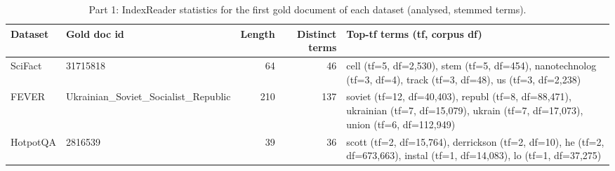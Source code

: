 \begin{table}[ht]\centering\small
\begin{tabular}{llrrp{}}\toprule
Dataset & Gold doc id & Length & Distinct terms & Top-tf terms (tf, corpus df) \\ \midrule
SciFact & 31715818 & 64 & 46 & cell (tf=5, df=2,530), stem (tf=5, df=454), nanotechnolog (tf=3, df=4), track (tf=3, df=48), us (tf=3, df=2,238) \\
FEVER & Ukrainian\_Soviet\_Socialist\_Republic & 210 & 137 & soviet (tf=12, df=40,403), republ (tf=8, df=88,471), ukrainian (tf=7, df=15,079), ukrain (tf=7, df=17,073), union (tf=6, df=112,949) \\
HotpotQA & 2816539 & 39 & 36 & scott (tf=2, df=15,764), derrickson (tf=2, df=10), he (tf=2, df=673,663), instal (tf=1, df=14,083), lo (tf=1, df=37,275) \\
\bottomrule\end{tabular}
\caption{Part 1: IndexReader statistics for the first gold document of each dataset (analysed, stemmed terms).}\label{tab:p1demo}\end{table}
